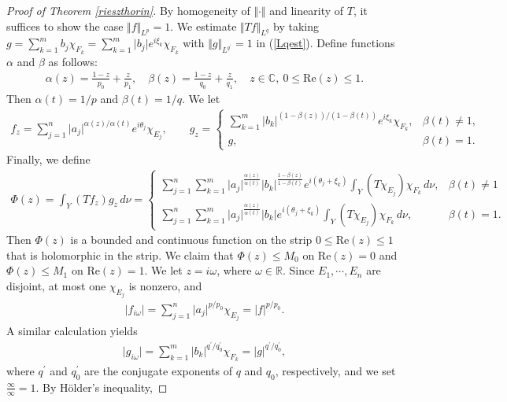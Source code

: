 \documentclass{article}
\numberwithin{equation}{section}
\newcommand{\bbC}{\mathbb{C}}
\newcommand{\bbR}{\mathbb{R}}
\renewcommand{\Re}{\mathrm{Re}}
\theoremstyle{plain}
\theoremstyle{definition}
\begin{document}
\begin{proof}[Proof of Theorem \ref{rieszthorin}]
By homogeneity of $\Vert\cdot\Vert$ and linearity of $T$, it suffices to show the case $\Vert f\Vert_{L^p}=1$. We estimate $\Vert Tf\Vert_{L^q}$ by taking $g=\sum_{k=1}^m b_j\chi_{F_k}=\sum_{k=1}^m\vert b_j\vert e^{i\xi_k}\chi_{F_k}$ with $\Vert g\Vert_{L^{q^\prime}}=1$ in (\ref{Lqest}). Define functions $\alpha$ and $\beta$ as follows:
\begin{align*}
	\alpha(z)=\frac{1-z}{p_0}+\frac{z}{p_1},\quad \beta(z)=\frac{1-z}{q_0}+\frac{z}{q_1},\quad z\in\bbC,\ 0\leq\Re(z)\leq 1.
\end{align*}
Then $\alpha(t)=1/p$ and $\beta(t)=1/q$. We let
\begin{align*}
	f_z=\sum_{j=1}^n\vert a_j\vert^{\alpha(z)/\alpha(t)} e^{i\theta_j}\chi_{E_j},\qquad g_z=\begin{cases}\sum_{k=1}^m\vert b_k\vert^{(1-\beta(z))/(1-\beta(t))}e^{i\xi_k}\chi_{F_k}, &\beta(t)\neq 1,\\
	g, &\beta(t)=1.
	\end{cases}
\end{align*}
Finally, we define
\begin{align*}
	\Phi(z)=\int_Y (Tf_z)g_z\,d\nu=\begin{cases}
		\sum_{j=1}^n\sum_{k=1}^m \vert a_j\vert^{\frac{\alpha(z)}{\alpha(t)}}\vert b_k\vert^{\frac{1-\beta(z)}{1-\beta(t)}} e^{i(\theta_j+\xi_k)}\int_Y(T\chi_{E_j})\chi_{F_k}\,d\nu, &\beta(t)\neq 1\\
		\sum_{j=1}^n\sum_{k=1}^m \vert a_j\vert^{\frac{\alpha(z)}{\alpha(t)}}\vert b_k\vert e^{i(\theta_j+\xi_k)}\int_Y(T\chi_{E_j})\chi_{F_k}\,d\nu, &\beta(t)=1.
	\end{cases}
\end{align*}
Then $\Phi(z)$ is a bounded and continuous function on the strip $0\leq\Re(z)\leq 1$ that is holomorphic in the strip. We claim that $\Phi(z)\leq M_0$ on $\Re(z)=0$ and $\Phi(z)\leq M_1$ on $\Re(z)=1$. We let $z=i\omega$, where $\omega\in\bbR$. Since $E_1,\cdots,E_n$ are disjoint, at most one $\chi_{E_j}$ is nonzero, and
\begin{align*}
	\vert f_{i\omega}\vert=\sum_{j=1}^n\vert a_j\vert^{p/p_0}\chi_{E_j}=\vert f\vert^{p/p_0}.
\end{align*}
A similar calculation yields
\begin{align*}
	\vert g_{i\omega}\vert=\sum_{k=1}^m \vert b_k\vert^{q^\prime/q_0^\prime}\chi_{F_k}=\vert g\vert^{q^\prime/q_0^\prime},
\end{align*}
where $q^\prime$ and $q_0^\prime$ are the conjugate exponents of $q$ and $q_0$, respectively, and we set $\frac{\infty}{\infty}=1$. By Hölder's inequality,

\end{proof}
\end{document}
